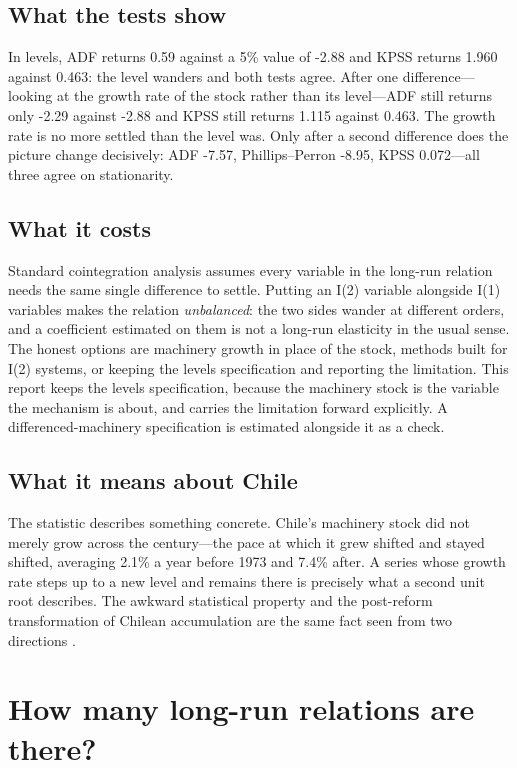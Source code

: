 \documentclass[11pt]{article}
\begin{document}
\subsection*{What the tests show}

In levels, ADF returns 0.59 against a 5\% value of -2.88 and KPSS returns 1.960 against 0.463: the level wanders and both tests agree. After one difference---looking at the growth rate of the stock rather than its level---ADF still returns only -2.29 against -2.88 and KPSS still returns 1.115 against 0.463. The growth rate is no more settled than the level was. Only after a second difference does the picture change decisively: ADF -7.57, Phillips--Perron -8.95, KPSS 0.072---all three agree on stationarity.

\subsection*{What it costs}

Standard cointegration analysis assumes every variable in the long-run relation needs the same single difference to settle. Putting an I(2) variable alongside I(1) variables makes the relation \emph{unbalanced}: the two sides wander at different orders, and a coefficient estimated on them is not a long-run elasticity in the usual sense. The honest options are machinery growth in place of the stock, methods built for I(2) systems, or keeping the levels specification and reporting the limitation. This report keeps the levels specification, because the machinery stock is the variable the mechanism is about, and carries the limitation forward explicitly. A differenced-machinery specification is estimated alongside it as a check.

\subsection*{What it means about Chile}

The statistic describes something concrete. Chile's machinery stock did not merely grow across the century---the pace at which it grew shifted and stayed shifted, averaging 2.1\% a year before 1973 and 7.4\% after. A series whose growth rate steps up to a new level and remains there is precisely what a second unit root describes. The awkward statistical property and the post-reform transformation of Chilean accumulation are the same fact seen from two directions \citep{ffd2002,solimano2024}.

\FloatBarrier
\section{How many long-run relations are there?}
\end{document}
